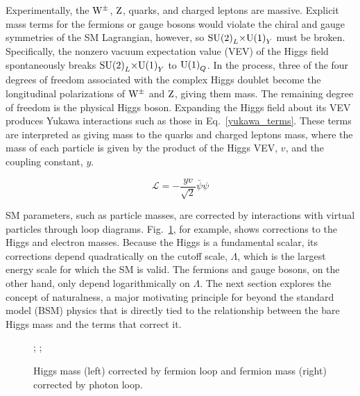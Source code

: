 \documentclass[12pt]{article}
\begin{document}
    Experimentally, the $\mathrm{W}^\pm$, $\mathrm{Z}$, quarks, and charged leptons are massive. Explicit mass terms for the fermions or gauge bosons would violate the chiral and gauge symmetries of the SM Lagrangian, however, so $\mathrm{SU} {{\left(2\right)}}_L {\times} \mathrm{U} {\left(1\right)}_Y$ must be broken. Specifically, the nonzero vacuum expectation value (VEV) of the Higgs field spontaneously breaks $\mathrm{SU} {{\left(2\right)}}_L {\times} \mathrm{U} {\left(1\right)}_Y$ to $\mathrm{U} {\left(1\right)}_Q$. In the process, three of the four degrees of freedom associated with the complex Higgs doublet become the longitudinal polarizations of $\mathrm{W}^\pm$ and $\mathrm{Z}$, giving them mass. The remaining degree of freedom is the physical Higgs boson. Expanding the Higgs field about its VEV produces Yukawa interactions such as those in Eq.~\ref{yukawa_terms}. These terms are interpreted as giving mass to the quarks and charged leptons mass, where the mass of each particle is given by the product of the Higgs VEV, $v$, and the coupling constant, $y$.

    \noindent \begin{equation}
        \mathcal{L} = -\frac{yv}{\sqrt{2}}\bar{\psi}\psi 
        \label{yukawa_terms}
    \end{equation}

    SM parameters, such as particle masses, are corrected by interactions with virtual particles through loop diagrams. Fig.~\ref{loop_diagrams}, for example, shows corrections to the Higgs and electron masses. Because the Higgs is a fundamental scalar, its corrections depend quadratically on the cutoff scale, $\Lambda$, which is the largest energy scale for which the SM is valid. The fermions and gauge bosons, on the other hand, only depend logarithmically on $\Lambda$. The next section explores the concept of naturalness, a major motivating principle for beyond the standard model (BSM) physics that is directly tied to the relationship between the bare Higgs mass and the terms that correct it.


    \noindent \begin{figure}[htbp] \begin{center}
        ;
        \qquad
        ;
        \caption{Higgs mass (left) corrected by fermion loop and fermion mass (right) corrected by photon loop.}
        \label{loop_diagrams}
    \end{center} \end{figure}
\end{document}
